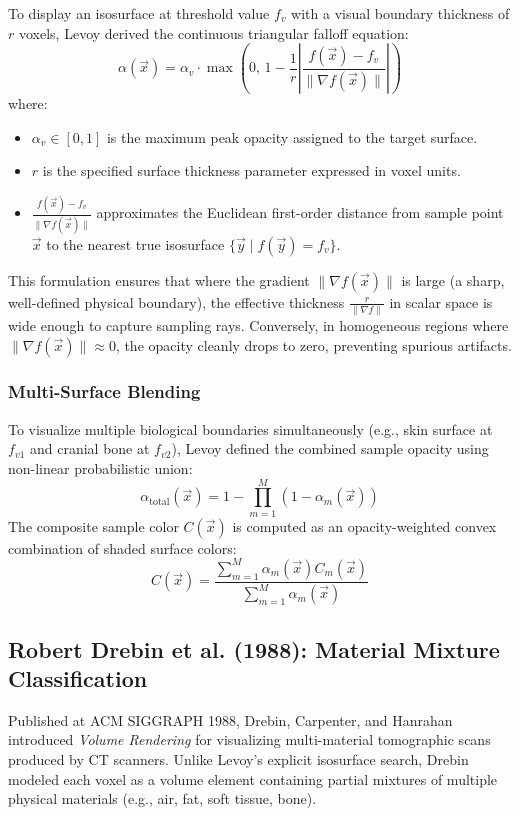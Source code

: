 \documentclass[10pt,twocolumn,a4paper]{article}
\begin{document}
To display an isosurface at threshold value $f_v$ with a visual boundary thickness of $r$ voxels, Levoy derived the continuous triangular falloff equation:
\begin{equation}
\alpha(\vec{x}) = \alpha_v \cdot \max\left(0, \, 1 - \frac{1}{r} \left| \frac{f(\vec{x}) - f_v}{\|\nabla f(\vec{x})\|} \right|\right)
\label{eq:levoy_opacity}
\end{equation}
where:
\begin{itemize}
    \item $\alpha_v \in [0, 1]$ is the maximum peak opacity assigned to the target surface.
    \item $r$ is the specified surface thickness parameter expressed in voxel units.
    \item $\frac{f(\vec{x}) - f_v}{\|\nabla f(\vec{x})\|}$ approximates the Euclidean first-order distance from sample point $\vec{x}$ to the nearest true isosurface $\{ \vec{y} \mid f(\vec{y}) = f_v \}$.
\end{itemize}
This formulation ensures that where the gradient $\|\nabla f(\vec{x})\|$ is large (a sharp, well-defined physical boundary), the effective thickness $\frac{r}{\|\nabla f\|}$ in scalar space is wide enough to capture sampling rays. Conversely, in homogeneous regions where $\|\nabla f(\vec{x})\| \approx 0$, the opacity cleanly drops to zero, preventing spurious artifacts.

\subsubsection{Multi-Surface Blending}
To visualize multiple biological boundaries simultaneously (e.g., skin surface at $f_{v1}$ and cranial bone at $f_{v2}$), Levoy defined the combined sample opacity using non-linear probabilistic union:
\begin{equation}
\alpha_{\text{total}}(\vec{x}) = 1 - \prod_{m=1}^{M} \left(1 - \alpha_m(\vec{x})\right)
\label{eq:levoy_multi}
\end{equation}
The composite sample color $C(\vec{x})$ is computed as an opacity-weighted convex combination of shaded surface colors:
\begin{equation}
C(\vec{x}) = \frac{\sum_{m=1}^{M} \alpha_m(\vec{x}) C_m(\vec{x})}{\sum_{m=1}^{M} \alpha_m(\vec{x})}
\end{equation}

\subsection{Robert Drebin et al. (1988): Material Mixture Classification}
Published at ACM SIGGRAPH 1988, Drebin, Carpenter, and Hanrahan introduced \textit{Volume Rendering} for visualizing multi-material tomographic scans produced by CT scanners. Unlike Levoy's explicit isosurface search, Drebin modeled each voxel as a volume element containing partial mixtures of multiple physical materials (e.g., air, fat, soft tissue, bone).
\end{document}
